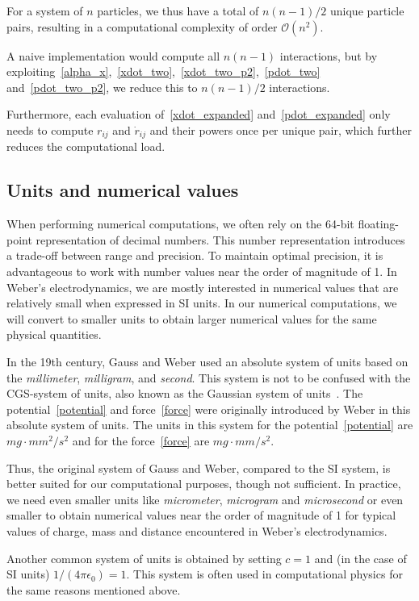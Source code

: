 \documentclass[12pt,a4paper]{article}
\theoremstyle{definition}
\theoremstyle{remark}
\begin{document}
For a system of $n$ particles, we thus have a total of $n(n-1)/2$ unique particle pairs, resulting in a computational complexity of order $\mathcal{O}(n^2)$.

A naive implementation would compute all $n(n-1)$ interactions, but by exploiting~\eqref{alpha_x},~\eqref{xdot_two},~\eqref{xdot_two_p2},~\eqref{pdot_two} and~\eqref{pdot_two_p2}, we reduce this to $n(n-1)/2$ interactions.

Furthermore, each evaluation of~\eqref{xdot_expanded} and~\eqref{pdot_expanded} only needs to compute $r_{ij}$ and $\dot{r}_{ij}$ and their powers once per unique pair, which further reduces the computational load.

\subsection{Units and numerical values}\label{units}
When performing numerical computations, we often rely on the 64-bit floating-point representation of decimal numbers. This number representation introduces a trade-off between range and precision. To maintain optimal precision, it is advantageous to work with number values near the order of magnitude of 1. In Weber's electrodynamics, we are mostly interested in numerical values that are relatively small when expressed in SI units. In our numerical computations, we will convert to smaller units to obtain larger numerical values for the same physical quantities.

In the 19th century, Gauss and Weber used an absolute system of units based on the \textit{millimeter}, \textit{milligram}, and \textit{second}. This system is not to be confused with the CGS-system of units, also known as the Gaussian system of units~\citep{assis-weber-vol1}. The potential~\eqref{potential} and force~\eqref{force} were originally introduced by Weber in this absolute system of units. The units in this system for the potential~\eqref{potential} are $mg \cdot mm^2 / s^2$ and for the force~\eqref{force} are $mg \cdot mm / s^2$.

Thus, the original system of Gauss and Weber, compared to the SI system, is better suited for our computational purposes, though not sufficient. In practice, we need even smaller units like \textit{micrometer}, \textit{microgram} and \textit{microsecond} or even smaller to obtain numerical values near the order of magnitude of 1 for typical values of charge, mass and distance encountered in Weber's electrodynamics.

Another common system of units is obtained by setting $c = 1$ and (in the case of SI units) $1/(4\pi \epsilon_0) = 1$. This system is often used in computational physics for the same reasons mentioned above.
\end{document}
